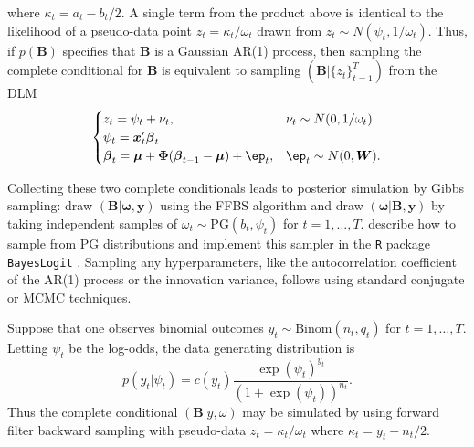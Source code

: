 \documentclass[12pt]{article}
\newcommand{\PG}{\text{PG}}
\newcommand{\bbeta}{\boldsymbol{\beta}}
\newcommand{\oomega}{\boldsymbol{\omega}}
\newcommand{\yy}{\boldsymbol{y}}
\newcommand{\vx}{\boldsymbol{x}}
\newcommand{\betap}{{\boldsymbol{B}}}
\newcommand{\bW}{\boldsymbol{W}}
\newcommand{\bPhi}{\boldsymbol{\Phi}}
\newcommand{\bmu}{\boldsymbol{\mu}}
\newcommand{\vep}{\boldsymbol{\ep}}
\begin{document}
where $\kappa_t = a_t - b_t / 2$.  A single term from the product above is
identical to the likelihood of a pseudo-data point $z_t = \kappa_t / \omega_t$
drawn from $z_t \sim N(\psi_t, 1/\omega_t)$.  Thus, if $p(\betap)$ specifies
that $\betap$ is a Gaussian AR(1) process, then sampling the complete
conditional for $\betap$ is equivalent to sampling $(\betap | \{z_t\}_{t=1}^T)$
from the DLM
\[
\begin{cases}
  z_t = \psi_t + \nu_t, & \nu_t \sim N(0, 1/\omega_t) \\
  \psi_t = \vx_t' \bbeta_t \\
  \bbeta_t = \bmu + \bPhi (\bbeta_{t-1} - \bmu) + \vep_t, & \vep_t \sim N(0, \bW).
\end{cases}
\]

Collecting these two complete conditionals leads to posterior simulation by
Gibbs sampling: draw $(\betap|\oomega, \yy)$ using the FFBS algorithm and draw
$(\oomega | \betap, \yy)$ by taking independent samples of $\omega_t \sim
\PG(b_t, \psi_t)$ for $t=1, \ldots, T$.  \cite{polson-etal-2013} describe how to
sample from $\PG$ distributions and implement this sampler in the \texttt{R}
package \texttt{BayesLogit} \citep{bayeslogit-2013}.  Sampling any
hyperparameters, like the autocorrelation coefficient of the AR(1) process or
the innovation variance, follows using standard conjugate or MCMC techniques.

\begin{example}
  Suppose that one observes binomial outcomes $y_t \sim \text{Binom}(n_t, q_t)$
  for $t=1, \ldots, T$.  Letting $\psi_t$ be the log-odds, the data generating
  distribution is
  \[
  p(y_t | \psi_t) = c(y_t) \frac{\exp(\psi_t)^{y_t}}{(1+\exp({\psi_t}))^{n_t}}.
  \]
  Thus the complete conditional $(\betap | y, \omega)$ may be simulated by using
  forward filter backward sampling with pseudo-data $z_t = \kappa_t / \omega_t$
  where $\kappa_t = y_t - n_t / 2$.
\end{example}
\end{document}
